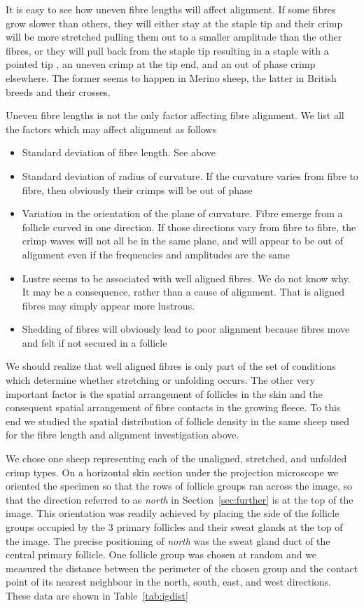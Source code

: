 \documentclass[titlepage,10pt]{article}  %
\begin{document}
It is easy to see how uneven fibre lengths will affect alignment. If some fibres grow slower than others, they will either stay at the staple tip and their crimp will be more stretched pulling them out to a smaller amplitude than the  other fibres, or they will pull back from the staple tip resulting in a staple with a pointed tip , an uneven crimp at the tip end, and an out of phase crimp elsewhere. The former seems to happen in Merino sheep, the latter in British breeds and their crosses.

Uneven fibre lengths is not the only factor affecting fibre alignment. We list all the factors which may affect alignment as follows
\begin{itemize}
\item Standard deviation of fibre length. See above
\item Standard deviation of radius of curvature. If the curvature varies from fibre to fibre, then obviously their crimps will be out of phase
\item Variation in the orientation of the plane of curvature. Fibre emerge from a follicle curved in one direction. If those directions vary from fibre to fibre, the crimp waves will not all be in the same plane, and will appear to be out of alignment even if the frequencies and amplitudes are the same
\item Lustre seems to be associated with well aligned fibres. We do not know why. It may be a consequence, rather than a cause of alignment. That is aligned fibres may simply appear more lustrous.
\item Shedding of fibres will obviously lead to poor alignment because fibres move and felt if not secured in a follicle
\end{itemize}


We should realize that well aligned fibres is only part of the set of conditions which determine whether stretching or unfolding occurs. The other very important factor is the spatial arrangement of follicles in the skin and the consequent spatial arrangement of fibre contacts in the growing fleece. To this end we studied the spatial distribution of follicle density in the same sheep used for the fibre length and alignment investigation above.


We chose one sheep representing each of the unaligned, stretched, and unfolded crimp types. On a horizontal skin section under the projection microscope we oriented the specimen so that the rows of follicle groups ran across the image, so that the direction referred to as {\em north} in Section~\ref{sec:further} is at the top of the image. This orientation was readily achieved by placing the side of the follicle groups occupied by the 3 primary follicles and their sweat glands at the top of the image. The precise positioning of {\em north} was the sweat gland duct of the central primary follicle. One follicle group was chosen at random and we measured the distance between the perimeter of the chosen group and the contact point of its nearest neighbour in the north, south, east, and west directions. These data are shown in Table~\ref{tab:igdist}
\end{document}
